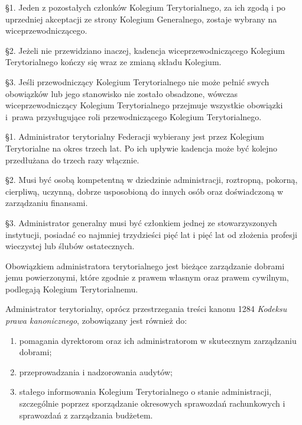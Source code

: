  \S{}1. Jeden z pozostałych członków Kolegium Terytorialnego, za ich zgodą i po uprzedniej akceptacji ze strony Kolegium Generalnego, zostaje wybrany na wiceprzewodniczącego.

\S{}2. Jeżeli nie przewidziano inaczej, kadencja wiceprzewodniczącego Kolegium Terytorialnego kończy się wraz ze zmianą składu Kolegium.

\S{}3. Jeśli przewodniczący Kolegium Terytorialnego nie może pełnić swych obowiązków lub jego stanowisko nie zostało obsadzone, wówczas wiceprzewodniczący Kolegium Terytorialnego przejmuje wszystkie obowiązki \mbox{i prawa} przysługujące roli przewodniczącego Kolegium Terytorialnego.


 \S{}1. Administrator terytorialny Federacji wybierany jest przez Kolegium Terytorialne na okres trzech lat. Po ich upływie kadencja może być kolejno przedłużana do trzech razy włącznie.

\S{}2. Musi być osobą kompetentną w dziedzinie administracji, roztropną, pokorną, cierpliwą, uczynną, dobrze usposobioną do innych osób oraz doświadczoną w zarządzaniu finansami.

\S{}3. Administrator generalny musi być członkiem jednej ze stowarzyszonych instytucji, posiadać co najmniej trzydzieści pięć lat i pięć lat od złożenia profesji wieczystej lub ślubów ostatecznych.


 Obowiązkiem administratora terytorialnego jest bieżące zarządzanie dobrami jemu powierzonymi, które zgodnie z prawem własnym oraz prawem cywilnym, podlegają Kolegium Terytorialnemu.

 Administrator terytorialny, oprócz przestrzegania treści kanonu 1284 {\em Kodeksu prawa kanonicznego}, zobowiązany jest również do:
\begin{enumerate}
	\item pomagania dyrektorom oraz ich administratorom w skutecznym zarządzaniu dobrami;
	\item przeprowadzania i nadzorowania audytów;
	\item stałego informowania Kolegium Terytorialnego o stanie administracji, szczególnie poprzez sporządzanie okresowych sprawozdań rachunkowych i sprawozdań z zarządzania budżetem.
\end{enumerate}


